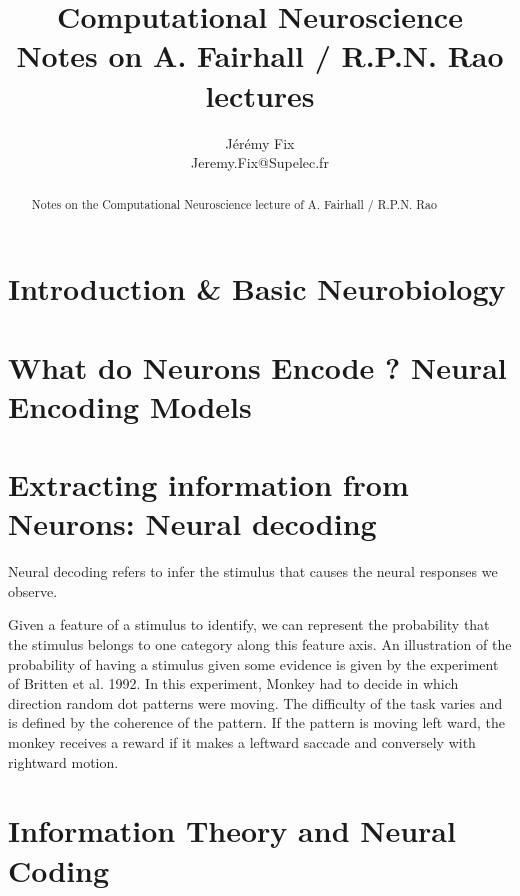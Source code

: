 \documentclass[10pt,a4paper]{article}
\title{Computational Neuroscience \\ 
		\large \vspace*{-10pt} Notes on A. Fairhall / R.P.N. Rao lectures\vspace*{10pt}}
\author{%
	Jérémy Fix \\
	Jeremy.Fix@Supelec.fr \\
	\vspace{20pt}
	}
\makeatletter
\def\printtitle{%
    {\color{bl} \centering \huge \sc \textbf{\@title}\par}}		%
\def\printauthor{%
    {\centering \small \@author}}				%
\makeatother
\begin{document}
\printtitle 

\printauthor

\begin{abstract}
Notes on the Computational Neuroscience lecture of A. Fairhall / R.P.N. Rao
\end{abstract}

\tableofcontents

\pagebreak

\section{Introduction \& Basic Neurobiology}

\section{What do Neurons Encode ? Neural Encoding Models}

\section{Extracting information from Neurons: Neural decoding}

Neural decoding refers to infer the stimulus that causes the neural responses we observe.

Given a feature of a stimulus to identify, we can represent the probability that the stimulus belongs to one category along this feature axis. An illustration of the probability of having a stimulus given some evidence is given by the experiment of Britten et al. 1992. In this experiment, Monkey had to decide in which direction random dot patterns were moving. The difficulty of the task varies and is defined by the coherence of the pattern. If the pattern is moving left ward, the monkey receives a reward if it makes a leftward saccade and conversely with rightward motion.

\section{Information Theory and Neural Coding}
\end{document}
